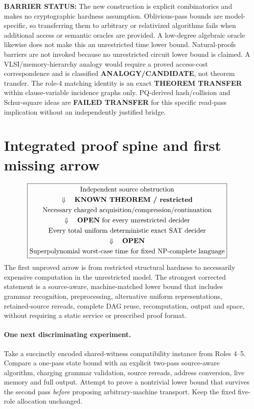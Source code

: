 \documentclass[11pt]{article}
\begin{document}
\textbf{BARRIER STATUS:} The new construction is explicit combinatorics and makes no cryptographic hardness assumption. Oblivious-pass bounds are model-specific, so transferring them to arbitrary or relativized algorithms fails when additional access or semantic oracles are provided. A low-degree algebraic oracle likewise does not make this an unrestricted time lower bound. Natural-proofs barriers are not invoked because no unrestricted circuit lower bound is claimed. A VLSI/memory-hierarchy analogy would require a proved access-cost correspondence and is classified \textbf{ANALOGY/CANDIDATE}, not theorem transfer. The role-4 matching identity is an exact \textbf{THEOREM TRANSFER} within clause-variable incidence graphs only. PQ-derived hash/collision and Schur-square ideas are \textbf{FAILED TRANSFER} for this specific read-pass implication without an independently justified bridge.

\section{Integrated proof spine and first missing arrow}
\[
\boxed{\begin{gathered}
\text{Independent source obstruction}\\
\Downarrow\quad\text{\textbf{KNOWN THEOREM / restricted}}\\
\text{Necessary charged acquisition/compression/continuation}\\
\Downarrow\quad\text{\textbf{OPEN} for every unrestricted decider}\\
\text{Every total uniform deterministic exact SAT decider}\\
\Downarrow\quad\text{\textbf{OPEN}}\\
\text{Superpolynomial worst-case time for fixed NP-complete language}
\end{gathered}}
\]
The first unproved arrow is from restricted structural hardness to necessarily expensive computation in the unrestricted model. The strongest corrected statement is a source-aware, machine-matched lower bound that includes grammar recognition, preprocessing, alternative uniform representations, retained-source rereads, complete DAG reuse, recomputation, output and space, without requiring a static service or prescribed proof format.

\paragraph{One next discriminating experiment.}
Take a succinctly encoded shared-witness compatibility instance from Roles 4--5. Compare a one-pass state bound with an explicit two-pass source-aware algorithm, charging grammar validation, source rereads, address conversion, live memory and full output. Attempt to prove a nontrivial lower bound that survives the second pass \emph{before} proposing arbitrary-machine transport. Keep the fixed five-role allocation unchanged.
\end{document}
